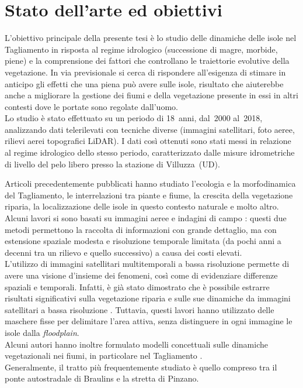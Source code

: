 \section{Stato dell'arte ed obiettivi}
\label{sec:stato-arte-obiettivi}
L'obiettivo principale della presente tesi è lo studio delle dinamiche delle isole nel Tagliamento in risposta al regime idrologico (successione di magre, morbide, piene) e la comprensione dei fattori che controllano le traiettorie evolutive della vegetazione.
In via previsionale si cerca di rispondere all'esigenza di stimare in anticipo gli effetti che una piena può avere sulle isole, risultato che aiuterebbe anche a migliorare la gestione dei fiumi e della vegetazione presente in essi in altri contesti dove le portate sono regolate dall'uomo. 
\\
Lo studio è stato effettuato su un periodo di 18~anni, dal~2000 al~2018, analizzando dati telerilevati con tecniche diverse (immagini satellitari, foto aeree, rilievi aerei topografici LiDAR).
I dati così ottenuti sono stati messi in relazione al regime idrologico dello stesso periodo, caratterizzato dalle misure idrometriche di livello del pelo libero presso la stazione di Villuzza~(UD). 

Articoli precedentemente pubblicati hanno studiato l'ecologia e la morfodinamica del Tagliamento, le interrelazioni tra piante e fiume, la crescita della vegetazione riparia, la localizzazione delle isole in questo contesto naturale e molto altro.
\\
Alcuni lavori si sono basati su immagini aeree e indagini di campo : questi due metodi permettono la raccolta di informazioni con grande dettaglio, ma con estensione spaziale modesta e risoluzione temporale limitata (da pochi anni a decenni tra un rilievo e quello successivo) a causa dei costi elevati.
\\
L'utilizzo di immagini satellitari multitemporali a bassa risoluzione permette di avere una visione d'insieme dei fenomeni, così come di evidenziare differenze spaziali e temporali.
Infatti, è già stato dimostrato che è possibile estrarre risultati significativi sulla vegetazione riparia e sulle sue dinamiche da immagini satellitari a bassa risoluzione .
Tuttavia, questi lavori hanno utilizzato delle maschere fisse per delimitare l'area attiva, senza distinguere in ogni immagine le isole dalla \emph{floodplain}.
\\
Alcuni autori hanno inoltre formulato modelli concettuali sulle dinamiche vegetazionali nei fiumi, in particolare nel Tagliamento .
\\
Generalmente, il tratto più frequentemente studiato è quello compreso tra il ponte autostradale di Braulins e la stretta di Pinzano.

